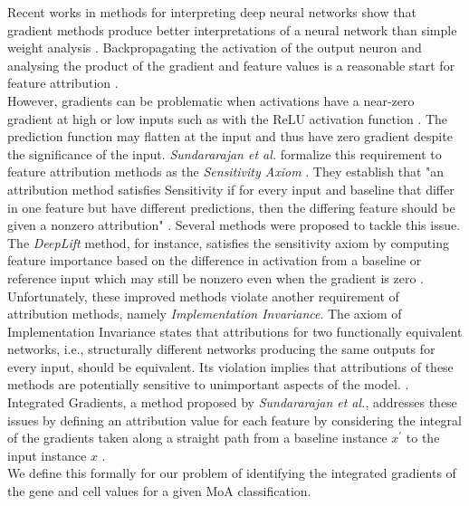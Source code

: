 \documentclass[bsc,frontabs,twoside,singlespacing,parskip,deptreport]{infthesis}     %
\begin{document}
Recent works in methods for interpreting deep neural networks show that gradient methods produce better interpretations of a neural network than simple weight analysis \cite{montavon_methods_2018}. Backpropagating the activation of the output neuron and analysing the product of the gradient and feature values is a reasonable start for feature attribution \cite{baehrens_how_nodate}.\\
However, gradients can be problematic when activations have a near-zero gradient at high or low inputs such as with the ReLU activation function \cite{shrikumar_not_2017}. The prediction function may flatten at the input and thus have zero gradient despite the significance of the input.
\textit{Sundararajan et al.} formalize this requirement to feature attribution methods as the \textit{Sensitivity Axiom} \cite{sundararajan_axiomatic_2017}. They establish that "an attribution method satisfies Sensitivity if for every input and baseline that differ in one feature but have different predictions, then the differing feature should be given a nonzero attribution" \cite{sundararajan_axiomatic_2017}.
Several methods were proposed to tackle this issue. The \textit{DeepLift} method, for instance, satisfies the sensitivity axiom by computing feature importance based on the difference in activation from a baseline or reference input which may still be nonzero even when the gradient is zero \cite{sundararajan_axiomatic_2017}.\\
Unfortunately, these improved methods violate another requirement of attribution methods, namely \textit{Implementation Invariance}. The axiom of Implementation Invariance states that attributions for two functionally equivalent networks, i.e., structurally different networks producing the same outputs for every input, should be equivalent. Its violation implies that attributions of these methods are potentially sensitive to unimportant aspects of the model. \cite{sundararajan_axiomatic_2017}. \\
Integrated Gradients, a method proposed by \textit{Sundararajan et al.}, addresses these issues by defining an attribution value for each feature by considering the integral of the gradients taken along a straight path from a baseline instance \(x^{\prime}\) to the input instance \(x\) \cite{sundararajan_axiomatic_2017}. \\

We define this formally for our problem of identifying the integrated gradients of the gene and cell values for a given MoA classification.
\end{document}
